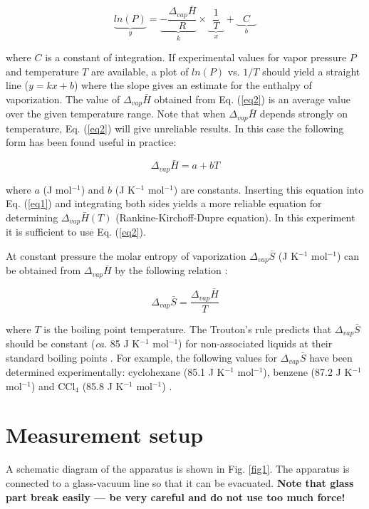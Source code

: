 \documentclass[byrevtex,amssymb,aps,pra,floatfix,letterpaper]{revtex4}
\begin{document}
\begin{equation}
\label{eq2}
\underbrace{ln(P)}_{y} = \underbrace{-\frac{\Delta_{vap}\bar{H}}{R}}_{k}\times\underbrace{~~\frac{1}{T}~~}_{x} 
+ \underbrace{~~~C~~~}_{b}
\end{equation}

\noindent
where $C$ is a constant of integration. If experimental values for vapor pressure $P$ and temperature $T$ are available, a plot of $ln(P)$ vs. $1/T$ should yield a straight line ($y = kx + b$) where the slope gives an estimate for the enthalpy of vaporization. The value of $\Delta_{vap}\bar{H}$ obtained from Eq. (\ref{eq2}) is an average value over the given temperature range. Note that when $\Delta_{vap}\bar{H}$ depends strongly on temperature, Eq. (\ref{eq2}) will give unreliable results. In this case the following form has been found useful in practice:

\begin{equation}
\label{eq3}
\Delta_{vap}\bar{H} = a + bT
\end{equation}

\noindent
where $a$ (J mol$^{-1}$) and $b$ (J K$^{-1}$ mol$^{-1}$) are constants. Inserting this equation into Eq. (\ref{eq1}) and integrating both sides yields a more reliable equation for determining $\Delta_{vap}\bar{H}(T)$ (Rankine-Kirchoff-Dupre equation). In this experiment it is sufficient to use Eq. (\ref{eq2}).

At constant pressure the molar entropy of vaporization $\Delta_{vap}\bar{S}$ (J K$^{-1}$ mol$^{-1}$) can be obtained from $\Delta_{vap}\bar{H}$ by the following relation \cite{TNOTES}:

\begin{equation}
\label{eq4}
\Delta_{vap}\bar{S} = \frac{\Delta_{vap}\bar{H}}{T}
\end{equation}

\noindent
where $T$ is the boiling point temperature. The Trouton's rule predicts that $\Delta_{vap}\bar{S}$ should be constant (\textit{ca}. 85 J K$^{-1}$ mol$^{-1}$) for non-associated liquids at their standard boiling points \cite{ATKINS1, TNOTES}. For example, the following values for $\Delta_{vap}\bar{S}$ have been determined 
experimentally: cyclohexane (85.1 J K$^{-1}$ mol$^{-1}$), benzene (87.2 J K$^{-1}$ mol$^{-1}$) and CCl$_4$  (85.8 J K$^{-1}$ mol$^{-1}$) \cite{TNOTES}.

\section{Measurement setup}
A schematic diagram of the apparatus is shown in Fig. \ref{fig1}. The apparatus is connected to a glass-vacuum line so that it can be evacuated. \textbf{Note that glass part break easily --- be very careful and do not use too much force!}
\end{document}
